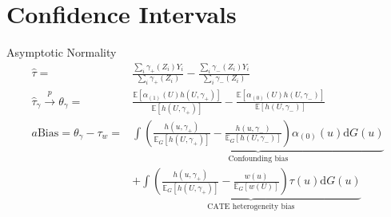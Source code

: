 \section{Confidence Intervals}

 \frame{\sectionpage}

 \begin{frame}{Asymptotic Normality}
    \begin{align*}
        \hat{\tau} =& \frac{\sum_i \gamma_+\left(Z_i\right)Y_i}{\sum_i {\gamma_+\left(Z_i\right)} } - \frac{\sum_i \gamma_-\left(Z_i\right)Y_i}{\sum_i {\gamma_-\left(Z_i\right)} }\\
        \hat{\tau}_{\gamma}\xrightarrow{p}\theta_{\gamma}= & \frac{\mathbb{E}\left[\alpha_{\left(1\right)}\left(U\right)h\left(U,\gamma_{+}\right)\right]}{\mathbb{E}\left[h\left(U,\gamma_{+}\right)\right]}-\frac{\mathbb{E}\left[\alpha_{\left(0\right)}\left(U\right)h\left(U,\gamma_{-}\right)\right]}{\mathbb{E}\left[h\left(U,\gamma_{-}\right)\right]} \\
        a\mathrm{Bias}=\theta_{\gamma}-\tau_{w}= & \underbrace{\int\left(\frac{h\left(u,\gamma_{+}\right)}{\mathbb{E}_{G}\left[h\left(U,\gamma_{+}\right)\right]}-\frac{h\left(u,\gamma_{-}\right)}{\mathbb{E}_{G}\left[h\left(U,\gamma_{-}\right)\right]}\right)\alpha_{\left(0\right)}\left(u\right)\mathrm{d}G\left(u\right)}_{\text{Confounding bias}} \\
         & +\underbrace{\int\left(\frac{h\left(u,\gamma_{+}\right)}{\mathbb{E}_{G}\left[h\left(U,\gamma_{+}\right)\right]}-\frac{w\left(u\right)}{\mathbb{E}_{G}\left[w\left(U\right)\right]}\right)\tau\left(u\right)\mathrm{d}G\left(u\right)}_{\text{CATE heterogeneity bias}}
    \end{align*}        
 \end{frame}

